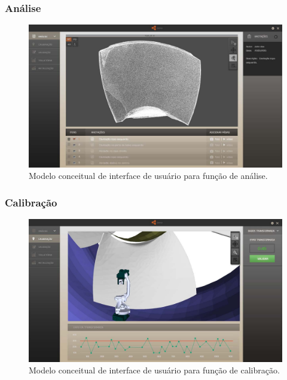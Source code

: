 \documentclass[12pt,a4paper]{article}
\begin{document}
\subsubsection {Análise}

\begin{figure}[H]
\begin{center}
  \includegraphics[width=.95\columnwidth]{figs/Analise.jpg}
  \caption{Modelo conceitual de interface de usuário para função de análise.}
  \label{fig:Interface_analise}
\end{center}
\end{figure} 

\subsubsection {Calibração}

\begin{figure}[H]
\begin{center}
  \includegraphics[width=.95\columnwidth]{figs/Calibracao.jpg}
  \caption{Modelo conceitual de interface de usuário para função de calibração.}
  \label{fig:Interface_calibracao}
\end{center}
\end{figure} 
\end{document}
